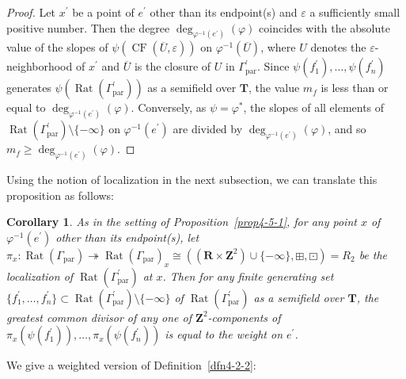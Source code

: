 \documentclass[a4paper,12pt]{amsart}
\newtheorem{cor}[dfn]{Corollary}
\def\Gamma{\varGamma}
\begin{document}
\begin{proof}
Let $x^{\prime}$ be a point of $e^{\prime}$ other than its endpoint(s) and $\varepsilon$ a sufficiently small positive number.
Then the degree $\operatorname{deg}_{\varphi^{-1}(e^{\prime})}(\varphi)$ coincides with the absolute value of the slopes of $\psi(\operatorname{CF}(\overline{U}, \varepsilon))$ on $\varphi^{-1}(\overline{U})$, where $U$ denotes the $\varepsilon$-neighborhood of $x^{\prime}$ and $\overline{U}$ is the closure of $U$ in $\Gamma^{\prime}_{\operatorname{par}}$.
Since $\psi(f^{\prime}_1), \ldots, \psi(f^{\prime}_n)$ generates $\psi(\operatorname{Rat}(\Gamma^{\prime}_{\operatorname{par}}))$ as a semifield over $\boldsymbol{T}$, the value $m_f$ is less than or equal to $\operatorname{deg}_{\varphi^{-1}(e^{\prime})}(\varphi)$.
Conversely, as $\psi = \varphi^{\ast}$, the slopes of all elements of $\operatorname{Rat}(\Gamma^{\prime}_{\operatorname{par}}) \setminus \{ - \infty \}$ on $\varphi^{-1}(e^{\prime})$ are divided by $\operatorname{deg}_{\varphi^{-1}(e^{\prime})}(\varphi)$, and so $m_f \ge \operatorname{deg}_{\varphi^{-1}(e^{\prime})}(\varphi)$.
\end{proof}

Using the notion of localization in the next subsection, we can translate this proposition as follows:

\begin{cor}
    \label{cor4-5-1}
As in the setting of Proposition~\ref{prop4-5-1}, for any point $x$ of $\varphi^{-1}(e^{\prime})$ other than its endpoint(s), let $\pi_x : \operatorname{Rat}(\Gamma_{\operatorname{par}}) \twoheadrightarrow \operatorname{Rat}(\Gamma_{\operatorname{par}})_x \cong ((\boldsymbol{R} \times \boldsymbol{Z}^2) \cup \{ -\infty \}, \boxplus, \boxdot) = R_2$ be the localization of $\operatorname{Rat}(\Gamma^{\prime}_{\operatorname{par}})$ at $x$.
Then for any finite generating set $\{ f_1^{\prime}, \ldots, f_n^{\prime} \} \subset \operatorname{Rat}(\Gamma^{\prime}_{\operatorname{par}}) \setminus \{ -\infty \}$ of $\operatorname{Rat}(\Gamma^{\prime}_{\operatorname{par}})$ as a semifield over $\boldsymbol{T}$, the greatest common divisor of any one of $\boldsymbol{Z}^2$-components of $\pi_x(\psi(f^{\prime}_1)), \ldots, \pi_x(\psi(f^{\prime}_n))$ is equal to the weight on $e^{\prime}$.
\end{cor}

We give a weighted version of Definition~\ref{dfn4-2-2}:
\end{document}
